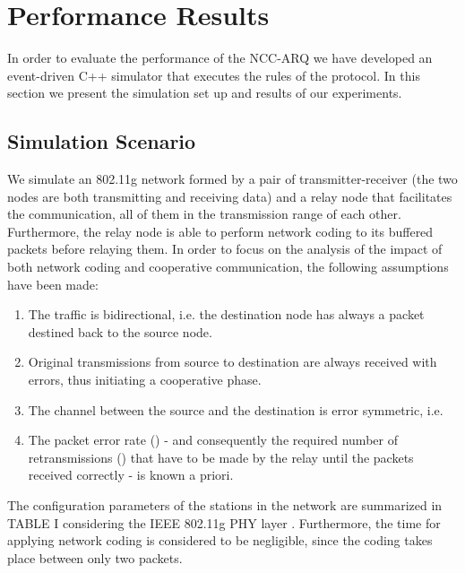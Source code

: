 \documentclass[conference]{IEEEtran}
\begin{document}
\section{Performance Results}
\label{sec:results}

In order to evaluate the performance of the NCC-ARQ we have developed an event-driven C++ simulator that executes the rules of the protocol. In this section we present the simulation set up and results of our experiments.

\subsection{Simulation Scenario}

We simulate an 802.11g network formed by a pair of transmitter-receiver (the two nodes are both transmitting and receiving data) and a relay node that facilitates the communication, all of them in the transmission range of each other. Furthermore, the relay node is able to perform network coding to its buffered packets before relaying them. In order to focus on the analysis of the impact of both network coding and cooperative communication, the following assumptions have been made:
\begin{enumerate}
\item The traffic is bidirectional, i.e. the destination node has always a packet destined back to the source node.
\item Original transmissions from source to destination are always received with errors, thus initiating a cooperative phase.
\item The channel between the source and the destination is error symmetric, i.e. 
\item The packet error rate () - and consequently the  required number of retransmissions () that have to be made by the relay until the packets received correctly - is known a priori.
\end{enumerate}

The configuration parameters of the stations in the network are summarized in TABLE I considering the IEEE 802.11g PHY layer \cite{IEEEhowto:80211g}. Furthermore, the time for applying network coding  is considered to be negligible, since the coding takes place between only two packets.
\end{document}
